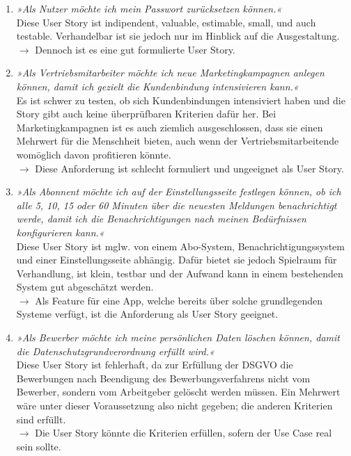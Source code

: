 \documentclass[main.tex]{subfiles}
\begin{document}
\begin{enumerate}
    \item \textit{»Als Nutzer möchte ich mein Passwort zurücksetzen können.«} \\
    Diese User Story ist indipendent, valuable, estimable, small, und auch testable. Verhandelbar ist sie jedoch nur im Hinblick auf die Ausgestaltung. \\
    $\rightarrow$ Dennoch ist es eine gut formulierte User Story.

    \item \textit{»Als Vertriebsmitarbeiter möchte ich neue Marketingkampagnen anlegen können, damit ich gezielt die Kundenbindung intensivieren kann.«}\\
    Es ist schwer zu testen, ob sich Kundenbindungen intensiviert haben und die Story gibt auch keine überprüfbaren Kriterien dafür her. Bei Marketingkampagnen ist es auch ziemlich ausgeschlossen, dass sie einen Mehrwert für die Menschheit bieten, auch wenn der Vertriebsmitarbeitende womöglich davon profitieren könnte.\\
    $\rightarrow$ Diese Anforderung ist schlecht formuliert und ungeeignet als User Story.
    
    \item \textit{»Als Abonnent möchte ich auf der Einstellungsseite festlegen können, ob ich alle 5, 10, 15 oder 60 Minuten über die neuesten Meldungen benachrichtigt werde, damit ich die Benachrichtigungen nach meinen Bedürfnissen konfigurieren kann.«} \\
    Diese User Story ist mglw. von einem Abo-System, Benachrichtigungssystem und einer Einstellungsseite abhängig. Dafür bietet sie jedoch Spielraum für Verhandlung, ist klein, testbar und der Aufwand kann in einem bestehenden System gut abgeschätzt werden. \\
    $\rightarrow$ Als Feature für eine App, welche bereits über solche grundlegenden Systeme verfügt, ist die Anforderung als User Story geeignet.

    
    \item \textit{»Als Bewerber möchte ich meine persönlichen Daten löschen können, damit die Datenschutzgrundverordnung erfüllt wird.«}\\
    Diese User Story ist fehlerhaft, da zur Erfüllung der DSGVO die Bewerbungen nach Beendigung des Bewerbungsverfahrens nicht vom Bewerber, sondern vom Arbeitgeber gelöscht werden müssen. Ein Mehrwert wäre unter dieser Voraussetzung also nicht gegeben; die anderen Kriterien sind erfüllt. \\
    $\rightarrow$ Die User Story könnte die Kriterien erfüllen, sofern der Use Case real sein sollte.
    

\end{enumerate}
\end{document}

